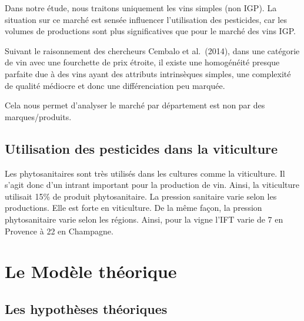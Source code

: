 \documentclass[11pt,]{article}
\begin{document}
\par

Dans notre étude, nous traitons uniquement les vins simples (non IGP).
La situation sur ce marché est sensée influencer l'utilisation des
pesticides, car les volumes de productions sont plus significatives que
pour le marché des vins IGP.

\par

Suivant le raisonnement des chercheurs Cembalo et al.~(2014), dans une
catégorie de vin avec une fourchette de prix étroite, il existe une
homogénéité presque parfaite due à des vins ayant des attributs
intrinsèques simples, une complexité de qualité médiocre et donc une
différenciation peu marquée.

\par

Cela nous permet d'analyser le marché par département est non par des
marques/produits.

\hypertarget{utilisation-des-pesticides-dans-la-viticulture}{%
\subsection{Utilisation des pesticides dans la
viticulture}\label{utilisation-des-pesticides-dans-la-viticulture}}

Les phytosanitaires sont très utilisés dans les cultures comme la
viticulture. Il s'agit donc d'un intrant important pour la production de
vin. Ainsi, la viticulture utilisait 15\% de produit phytosanitaire. La
pression sanitaire varie selon les productions. Elle est forte en
viticulture. De la même façon, la pression phytosanitaire varie selon
les régions. Ainsi, pour la vigne l'IFT varie de 7 en Provence à 22 en
Champagne.

\FloatBarrier

\hypertarget{le-modele-theorique}{%
\section{Le Modèle théorique}\label{le-modele-theorique}}

\FloatBarrier

\hypertarget{les-hypotheses-theoriques}{%
\subsection{Les hypothèses théoriques}\label{les-hypotheses-theoriques}}

\FloatBarrier
\end{document}

